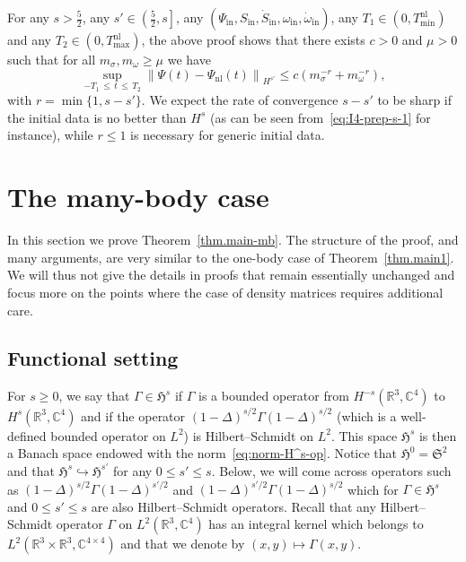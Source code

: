 \documentclass[AHL,Unicode,longabstracts,published]{cedram}
\newcommand{\rmin}{\mathrm{in}}
\newcommand{\nl}{\mathrm{nl}}
\newcommand\R{\mathbb{R}}
\newcommand\C{\mathbb{C}}
\renewcommand\le{\leqslant}
\newcommand{\gS}{\mathfrak{S}}
\newcommand{\gH}{\mathfrak{H}}
\begin{document}
\begin{rema}\label{rk:rate}
For any $s>\tfrac52$, any $s'\in\left(\tfrac52,s\right]$, any $(\Psi_{\rmin},S_{\rmin}, \dot{S}_{\rmin}, \omega_{\rmin},\dot{\omega}_{\rmin})$, any $T_1\in(0,T_{\min}^{\nl})$ and any $T_2\in(0,T_{\max}^{\nl})$, the above proof shows that there exists $c>0$ and $\mu>0$ such that for all $m_\sigma,m_\omega\geq\mu$ we have
\[
\sup_{-T_1\,\leq\,t\,\leq\,T_2}\left\|\Psi(t)-\Psi_{\nl}(t)\right\|_{H^{s'}}\le c\left(m_\sigma^{-r}+m_\omega^{-r}\right),
\]
with $r=\min\{1,s-s'\}$. We expect the rate of convergence $s-s'$ to be sharp if the initial data is no better than $H^s$ (as can be seen from~\eqref{eq:I4-prep-s-1} for instance), while $r\le1$ is necessary for generic initial data.
\end{rema}

\section{The many-body case}\label{sect:many-body}

In this section we prove Theorem~\ref{thm.main-mb}. The structure of the proof, and many arguments, are very similar to the one-body case of Theorem~\ref{thm.main1}. We will thus not give the details in proofs that remain essentially unchanged and focus more on the points where the case of density matrices requires additional care.

\subsection{Functional setting}

For $s\geq 0$, we say that $\Gamma\in\gH^s$ if $\Gamma$ is a bounded operator from $H^{-s}(\R^3,\C^4)$ to $H^s(\R^3,\C^4)$ and if the operator $(1-\Delta)^{s/2}\Gamma (1-\Delta)^{s/2}$ (which is a well-defined bounded operator on $L^2$) is Hilbert--Schmidt on $L^2$. This space $\gH^s$ is then a Banach space endowed with the norm~\eqref{eq:norm-H^s-op}. Notice that $\gH^0=\gS^2$ and that $\gH^{s}\hookrightarrow \gH^{s'}$ for any $0\leq s'\leq s$. Below, we will come across operators such as $(1-\Delta)^{s/2}\Gamma(1-\Delta)^{s'/2}$ and $(1-\Delta)^{s'/2}\Gamma(1-\Delta)^{s/2}$ which for $\Gamma\in\gH^{s}$ and $0\leq s'\leq s$ are also Hilbert--Schmidt operators. Recall that any Hilbert--Schmidt operator $\Gamma$ on $L^2(\R^3,\C^4)$ has an integral kernel which belongs to $L^2(\R^3\times\R^3,\C^{4\times4})$ and that we denote by $(x,y)\mapsto\Gamma(x,y)$.
\end{document}
